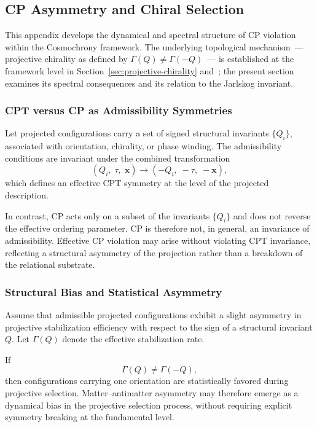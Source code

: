 \subsection{CP Asymmetry and Chiral Selection}
  \label{subsec:cp-asymmetry-and-chiral-selection}

  This appendix develops the dynamical and spectral structure of CP violation
  within the Cosmochrony framework.
  The underlying topological mechanism~--- projective chirality as defined
  by $\Gamma(Q) \neq \Gamma(-Q)$~--- is established at the framework level
  in Section~\ref{sec:projective-chirality} and~\cite{Beau2026k};
  the present section examines its spectral consequences and its relation
  to the Jarlskog invariant.

  \subsubsection*{CPT versus CP as Admissibility Symmetries}

    Let projected configurations carry a set of signed structural invariants
    $\{Q_i\}$, associated with orientation, chirality, or phase winding.
    The admissibility conditions are invariant under the combined transformation
    \[
      (Q_i,\;\tau,\;\mathbf{x}) \rightarrow (-Q_i,\;-\tau,\;-\mathbf{x}),
    \]
    which defines an effective CPT symmetry at the level of the projected description.

    In contrast, CP acts only on a subset of the invariants $\{Q_i\}$
    and does not reverse the effective ordering parameter.
    CP is therefore not, in general, an invariance of admissibility.
    Effective CP violation may arise without violating CPT invariance,
    reflecting a structural asymmetry of the projection
    rather than a breakdown of the relational substrate.

  \subsubsection*{Structural Bias and Statistical Asymmetry}

    Assume that admissible projected configurations exhibit a slight asymmetry in
    projective stabilization efficiency with respect to the sign of a structural
    invariant $Q$.
    Let $\Gamma(Q)$ denote the effective stabilization rate.

    If
    \[
      \Gamma(Q) \neq \Gamma(-Q),
    \]
    then configurations carrying one orientation are statistically favored during
    projective selection.
    Matter--antimatter asymmetry may therefore emerge as a dynamical bias in the
    projective selection process, without requiring explicit symmetry breaking
    at the fundamental level.

